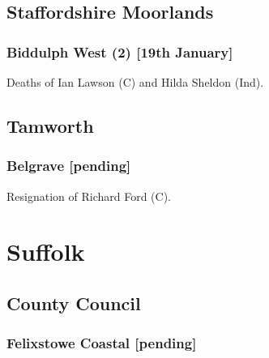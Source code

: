 \documentclass[a4paper,openany]{book}
\begin{document}
\begin{resultsiii}
\subsection*{Staffordshire Moorlands}

\subsubsection*{Biddulph West (2) \hspace*{\fill}\nolinebreak[1]%
	\enspace\hspace*{\fill}
	[19th January]}


Deaths of Ian Lawson (C) and Hilda Sheldon (Ind).

\subsection*{Tamworth}

\subsubsection*{Belgrave \hspace*{\fill}\nolinebreak[1]%
	\enspace\hspace*{\fill}
	[pending]}


Resignation of Richard Ford (C).

\section{Suffolk}

\subsection*{County Council}

\subsubsection*{Felixstowe Coastal \hspace*{\fill}\nolinebreak[1]%
	\enspace\hspace*{\fill}
	[pending]}



\end{resultsiii}
\end{document}
